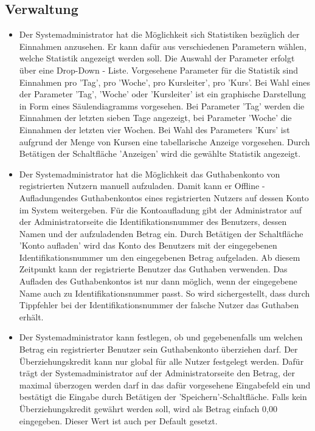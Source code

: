 \documentclass[a4paper]{scrreprt}
\begin{document}
		\subsection{Verwaltung}
			\begin{itemize}
				\item {}
					Der Systemadministrator hat die Möglichkeit sich Statistiken bezüglich der Einnahmen anzusehen. Er kann dafür aus 	verschiedenen Parametern wählen, welche Statistik angezeigt werden soll. Die Auswahl der Parameter erfolgt über eine Drop-Down - Liste. Vorgesehene Parameter für die Statistik sind Einnahmen pro 'Tag', pro 'Woche', pro Kursleiter', pro 'Kurs'. Bei Wahl eines der Parameter 'Tag', 'Woche' oder 'Kursleiter' ist ein graphische Darstellung in Form eines Säulendiagramms vorgesehen. Bei Parameter 'Tag' werden die Einnahmen der letzten sieben Tage angezeigt, bei Parameter 'Woche' die Einnahmen der letzten vier Wochen. Bei Wahl des Parameters 'Kurs' ist aufgrund der Menge von Kursen eine tabellarische Anzeige vorgesehen. Durch Betätigen der Schaltfläche 'Anzeigen' wird die gewählte Statistik angezeigt.
				\item {}
					Der Systemadministrator hat die Möglichkeit das Guthabenkonto von  registrierten Nutzern manuell aufzuladen. Damit kann er \glqq Offline - Aufladungen\grqq  des Guthabenkontos eines registrierten Nutzers auf dessen Konto im System weitergeben. Für die Kontoaufladung gibt der Administrator auf der Administratorseite die Identifikationsnummer des Benutzers, dessen Namen und der aufzuladenden Betrag ein. Durch Betätigen der Schaltfläche 'Konto aufladen' wird das Konto des Benutzers mit der eingegebenen Identifikationsnummer um den eingegebenen Betrag aufgeladen. Ab diesem Zeitpunkt kann der registrierte Benutzer das Guthaben verwenden. Das Aufladen des Guthabenkontos ist nur dann möglich, wenn der eingegebene Name auch zu Identifikationsnummer passt. So wird sichergestellt, dass durch Tippfehler bei der Identifikationsnummer der falsche Nutzer das Guthaben erhält.
				\item {}
					Der Systemadministrator kann festlegen, ob und gegebenenfalls um welchen Betrag ein registrierter Benutzer sein Guthabenkonto überziehen darf. Der Überziehungskredit kann nur global für alle Nutzer festgelegt werden. Dafür trägt der Systemadministrator auf der Administratorseite den Betrag, der maximal überzogen werden darf in das dafür vorgesehene Eingabefeld ein und bestätigt die Eingabe durch Betätigen der 'Speichern'-Schaltfläche.
					Falls kein Überziehungskredit gewährt werden soll, wird als Betrag einfach 0,00 eingegeben. Dieser Wert ist auch per Default gesetzt.
			\end{itemize}
			
\end{document}
